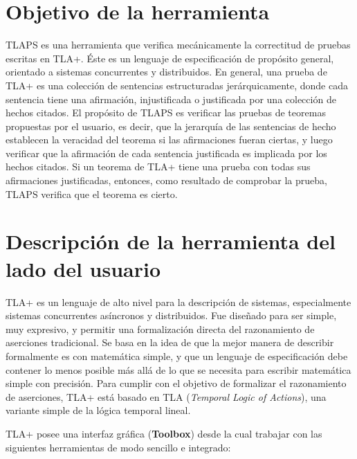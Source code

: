 \documentclass[spanish]{llncs}
\begin{document}


\section{Objetivo de la herramienta}

TLAPS es una herramienta que verifica mecánicamente la correctitud de pruebas escritas en TLA+.
Éste es un lenguaje de especificación de propósito general, orientado a sistemas concurrentes y distribuidos\cite{highlevel}.
En general, una prueba de TLA+ es una colección de sentencias estructuradas jerárquicamente,
donde cada sentencia tiene una afirmación, injustificada o justificada por una colección de hechos citados.
El propósito de TLAPS es verificar las pruebas de teoremas propuestas por el usuario, es decir,
que la jerarquía de las sentencias de hecho establecen la veracidad del teorema si las afirmaciones fueran ciertas,
y luego verificar que la afirmación de cada sentencia justificada es implicada por los hechos citados\cite{tlaps}.
Si un teorema de TLA+ tiene una prueba con todas sus afirmaciones justificadas, entonces, como resultado
de comprobar la prueba, TLAPS verifica que el teorema es cierto.

\section{Descripción de la herramienta del lado del usuario}
TLA+ es un lenguaje de alto nivel para la descripción de sistemas, especialmente sistemas concurrentes asíncronos y distribuidos. 
Fue diseñado para ser simple, muy expresivo, y permitir una formalización directa del razonamiento de aserciones tradicional.
Se basa en la idea de que la mejor manera de describir formalmente es con matemática simple, y que un lenguaje de especificación debe contener lo menos posible más allá de lo que se necesita para escribir matemática simple con precisión. Para cumplir con el objetivo de formalizar el razonamiento de aserciones, TLA+ está basado en TLA (\textit{Temporal Logic of Actions}), una variante simple de la lógica temporal lineal.

TLA+ posee una interfaz gráfica (\textbf{Toolbox}) desde la cual trabajar con las siguientes herramientas de modo sencillo e integrado:
\end{document}
